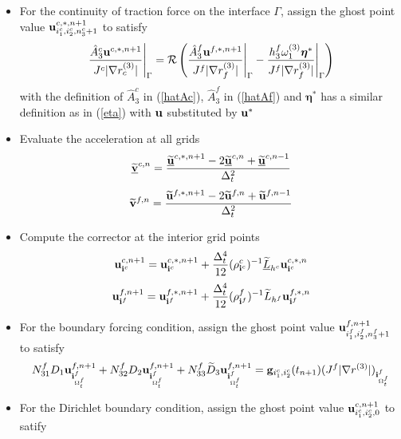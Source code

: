 \begin{breakablealgorithm}
\begin{itemize}
{		}
		\item{For the continuity of traction force on the interface $\Gamma$, assign the ghost point value ${\bf u}^{c,*,n+1}_{i_1^c,i_2^c,n_3^c+1}$ to satisfy
			\begin{equation}\label{traction_gamma_pre}
			\frac{\hat{A}_3^c{\bf u}^{c,*,n+1}}{J^c|\nabla r_c^{(3)}|}\Bigg|_{\Gamma} = \mathcal{R}\left(\frac{\hat{A}_3^f{\bf u}^{f,*,n+1}}{J^f|\nabla r_f^{(3)}|}\Bigg|_{\Gamma} - \frac{h_3^f\omega_1^{(3)}{\bm \eta}^*}{J^f|\nabla r_f^{(3)}|}\Bigg|_{\Gamma}\right)
			\end{equation}
			with the definition of $\hat{A}^c_3$ in (\ref{hatAc}), $\hat{A}^f_3$ in (\ref{hatAf}) and ${\bm \eta}^*$ has a similar definition as in (\ref{eta}) with ${\bf u}$ substituted by ${\bf u}^*$
		}
		\item{Evaluate the acceleration at all grids 
			\begin{equation*}
			\uline{\wt{\bf v}}^{c,n} = \frac{\uline{\wt{\bf u}}^{c,*,n+1}-2\uline{\wt{\bf u}}^{c,n}+\uline{\wt{\bf u}}^{c,n-1}}{\Delta^2_t}
			\end{equation*}
			\begin{equation*}
			\widetilde{\bf v}^{f,n} = \frac{\widetilde{\bf u}^{f,*,n+1}-2\widetilde{\bf u}^{f,n}+\widetilde{\bf u}^{f,n-1}}{\Delta^2_t}
			\end{equation*}
		}
		\item{Compute the corrector at the interior grid points
			\begin{equation*}
			{\bf u}^{c,n+1}_{{\bf i}^c} = {\bf u}^{c,*,n+1}_{{\bf i}^c} + \frac{\Delta_t^4}{12}(\rho^c_{{\bf i}^c})^{-1}\uline{\wt{L}}_{h^c}{\bf{u}}^{c,*,n}_{{\bf i}^c}
			\end{equation*}
			\begin{equation*}
			{\bf u}^{f,n+1}_{{\bf i}^f} = {\bf u}^{f,*,n+1}_{{\bf i}^f} + \frac{\Delta_t^4}{12}(\rho^f_{{\bf i}^f})^{-1}\widetilde{L}_{h^f}{\bf{u}}^{f,*,n}_{{\bf i}^f}
			\end{equation*}
		}
		\item {For the boundary forcing condition, assign the ghost point value ${\bf u}^{f,n+1}_{i^f_1,i^f_2,n_3^f+1}$ to satisfy
			\begin{equation*}
			N_{31}^fD_1{\bf u}^{f,n+1}_{{\bf i}^f_{\Omega^f_t}} + N_{32}^fD_2{\bf u}^{f,n+1}_{{\bf i}^f_{\Omega^f_t}} + N_{33}^f\widetilde{D}_3{\bf u}^{f,n+1}_{{\bf i}^f_{\Omega^f_t}} = {\bf g}_{i^c_1,i^c_2}(t_{n+1})(J^f|\nabla r^{(3)}|)_{{\bf i}^f_{\Omega^f_t}}
			\end{equation*}	
		}
		\item {For the Dirichlet boundary condition, assign the ghost point value ${\bf u}^{c,n+1}_{i^c_1,i^c_2,0}$ to satify
}
\end{itemize}
\end{breakablealgorithm}
